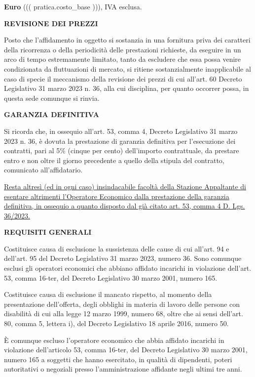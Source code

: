 \textbf{Euro} ((( pratica.costo_base ))), IVA esclusa.

\textbf{REVISIONE DEI PREZZI}

Posto che l'affidamento in oggetto si sostanzia in una fornitura priva
dei caratteri della ricorrenza o della periodicità delle prestazioni
richieste, da eseguire in un arco di tempo estremamente limitato, tanto da
escludere che essa possa venire condizionata da fluttuazioni di mercato,
si ritiene sostanzialmente inapplicabile al caso di specie il meccanismo
della revisione dei prezzi di cui all'art. 60 Decreto Legislativo
31 marzo 2023 n. 36, alla cui disciplina, per quanto occorrer possa,
in questa sede comunque si rinvia.

\textbf{GARANZIA DEFINITIVA}

Si ricorda che, in ossequio all'art. 53, comma 4, Decreto Legislativo
31 marzo 2023 n. 36, è dovuta la prestazione di garanzia definitiva per
l'esecuzione dei contratti, pari al 5\% (cinque per cento) dell'importo
contrattuale, da prestare entro e non oltre il giorno precedente a quello
della stipula del contratto, comunicato all'affidatario.

\ul{Resta altres\`i (ed in ogni caso) insindacabile facolt\`a della
Stazione Appaltante di esentare altrimenti l'Operatore Economico dalla
prestazione della garanzia definitiva, in ossequio a quanto disposto
dal gi\`a citato art. 53, comma 4 D. Lgs. 36/2023.}

\textbf{REQUISITI GENERALI}

Costituisce causa di esclusione la sussistenza delle cause di cui
all'art. 94 e dell'art. 95 del Decreto Legislativo 31 marzo 2023,
numero 36. Sono comunque esclusi gli operatori economici che abbiano
affidato incarichi in violazione dell'art. 53, comma 16-ter, del
Decreto Legislativo 30 marzo 2001, numero 165.

Costituisce causa di esclusione il mancato rispetto, al momento della
presentazione dell'offerta, degli obblighi in materia di lavoro delle
persone con disabilità di cui alla legge 12 marzo 1999, numero 68,
oltre che ai sensi dell'art. 80, comma 5, lettera i), del Decreto
Legislativo 18 aprile 2016, numero 50.

È comunque escluso l'operatore economico che abbia affidato incarichi
in violazione dell'articolo 53, comma 16-ter, del Decreto Legislativo
30 marzo 2001, numero 165 a soggetti che hanno esercitato, in qualità
di dipendenti, poteri autoritativi o negoziali presso l'amministrazione
affidante negli ultimi tre anni.

